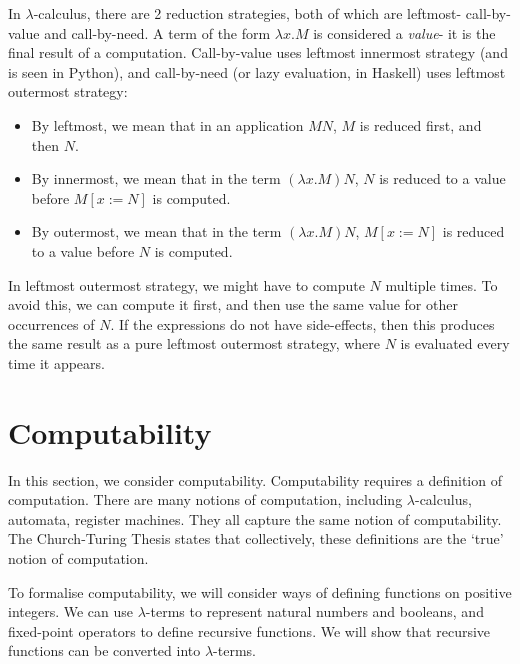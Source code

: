 \documentclass[a4paper, openany]{memoir}
\theoremstyle{definition}
\begin{document}
    In $\lambda$-calculus, there are 2 reduction strategies, both of which are leftmost- call-by-value and call-by-need. A term of the form $\lambda x.M$ is considered a \emph{value}- it is the final result of a computation. Call-by-value uses leftmost innermost strategy (and is seen in Python), and call-by-need (or lazy evaluation, in Haskell) uses leftmost outermost strategy:
    \begin{itemize}
        \item By leftmost, we mean that in an application $MN$, $M$ is reduced first, and then $N$.
        \item By innermost, we mean that in the term $(\lambda x.M) N$, $N$ is reduced to a value before $M[x := N]$ is computed.
        \item By outermost, we mean that in the term $(\lambda x.M) N$, $M[x := N]$ is reduced to a value before $N$ is computed. 
    \end{itemize}
    In leftmost outermost strategy, we might have to compute $N$ multiple times. To avoid this, we can compute it first, and then use the same value for other occurrences of $N$. If the expressions do not have side-effects, then this produces the same result as a pure leftmost outermost strategy, where $N$ is evaluated every time it appears.
    \newpage

    \section{Computability}
    In this section, we consider computability. Computability requires a definition of computation. There are many notions of computation, including $\lambda$-calculus, automata, register machines. They all capture the same notion of computability. The Church-Turing Thesis states that collectively, these definitions are the `true' notion of computation.

    To formalise computability, we will consider ways of defining functions on positive integers. We can use $\lambda$-terms to represent natural numbers and booleans, and fixed-point operators to define recursive functions. We will show that recursive functions can be converted into $\lambda$-terms.
\end{document}
